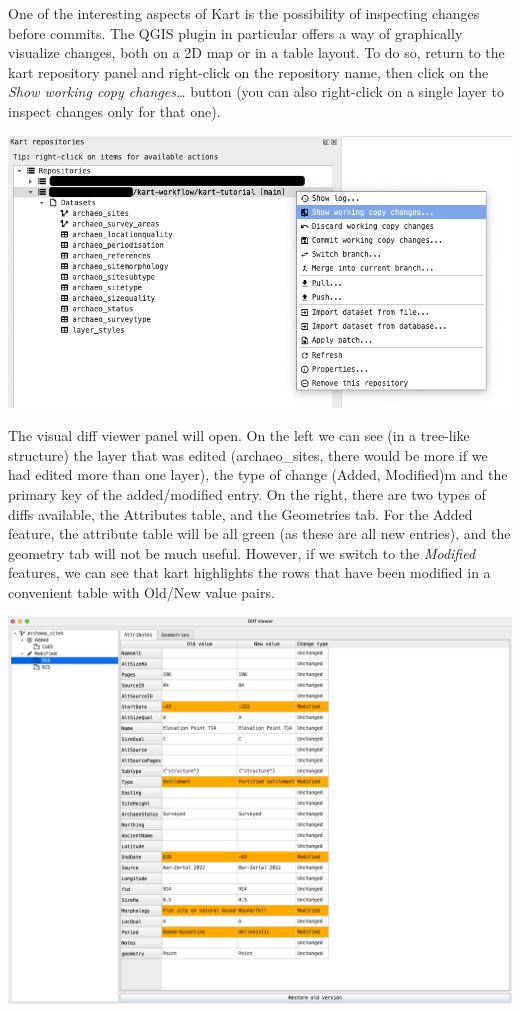 \documentclass[
  letterpaper,
  DIV=11,
  numbers=noendperiod]{scrartcl}
\begin{document}
One of the interesting aspects of Kart is the possibility of inspecting
changes before commits. The QGIS plugin in particular offers a way of
graphically visualize changes, both on a 2D map or in a table layout. To
do so, return to the kart repository panel and right-click on the
repository name, then click on the \emph{Show working copy
changes\ldots{}} button (you can also right-click on a single layer to
inspect changes only for that one).

\begin{center}
\includegraphics{img/kart-panel-show-wc-changes.png}
\end{center}

The visual diff viewer panel will open. On the left we can see (in a
tree-like structure) the layer that was edited (archaeo\_sites, there
would be more if we had edited more than one layer), the type of change
(Added, Modified)m and the primary key of the added/modified entry. On
the right, there are two types of diffs available, the Attributes table,
and the Geometries tab. For the Added feature, the attribute table will
be all green (as these are all new entries), and the geometry tab will
not be much useful. However, if we switch to the \emph{Modified}
features, we can see that kart highlights the rows that have been
modified in a convenient table with Old/New value pairs.

\begin{center}
\includegraphics{img/kart-diff-attributes.png}
\end{center}
\end{document}
